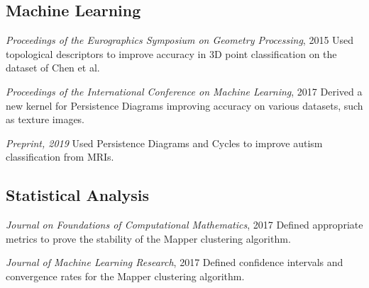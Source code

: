 \documentclass[11pt,a4paper]{moderncv}
\begin{document}
	\subsection{Machine Learning}

			  {\textit{Proceedings of the Eurographics Symposium on Geometry Processing}, 2015}
                          {}{}{\small Used topological descriptors to improve accuracy in 3D point classification on the dataset of Chen et al.}

                          {\textit{Proceedings of the International Conference on Machine Learning}, 2017}
			  {}{}{\small Derived a new kernel for Persistence Diagrams improving accuracy on various datasets, such as texture images. }

                          {\textit{Preprint, 2019}}
                          {}{}{\small Used Persistence Diagrams and Cycles to improve autism classification from MRIs.}

	\subsection{Statistical Analysis}

                          {\textit{Journal on Foundations of Computational Mathematics}, 2017}
                          {}{}{\small Defined appropriate metrics to prove the stability of the Mapper clustering algorithm.}


                          {\textit{Journal of Machine Learning Research}, 2017}
                          {}{}{\small Defined confidence intervals and convergence rates for the Mapper clustering algorithm.}
\end{document}

